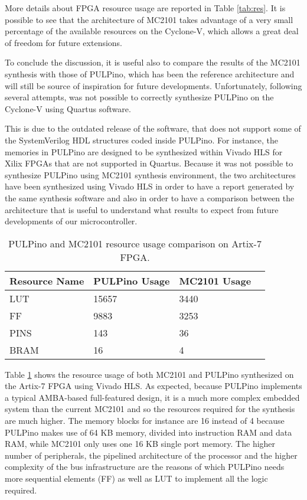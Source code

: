 More details about FPGA resource usage are reported in Table \ref{tab:res}. It is possible to see that the architecture of MC2101 takes advantage of a very small percentage of the available resources on the Cyclone-V, which allows a great deal of freedom for future extensions.

To conclude the discussion, it is useful also to compare the results of the MC2101 synthesis with those of PULPino, which has been the reference architecture and will still be source of inspiration for future developments. Unfortunately, following several attempts, was not possible to correctly synthesize PULPino on the Cyclone-V using Quartus software.

This is due to the outdated release of the software, that does not support some of the SystemVerilog HDL structures coded inside PULPino. For instance, the memories in PULPino are designed to be synthesized within Vivado HLS for Xilix FPGAs that are not supported in Quartus. Because it was not possible to synthesize PULPino using MC2101 synthesis environment, the two architectures have been synthesized using Vivado HLS in order to have a report generated by the same synthesis software and also in order to have a comparison between the architecture that is useful to understand what results to expect from future developments of our microcontroller.

\begin{table}
\centering
\begin{tabular}{| p{3cm} | p{2cm} | p{2cm} | p{2cm} |}
 \hline
 \textbf{Resource Name} & \textbf{PULPino Usage} & \textbf{MC2101 Usage}\\ \hline
 \hline\hline
  LUT & 15657  & 3440\\ 
 \hline
 FF & 9883  & 3253 \\
 \hline
 PINS & 143 & 36 \\
 \hline
 BRAM & 16 & 4 \\
 \hline
\end{tabular}
\caption{PULPino and MC2101 resource usage comparison on Artix-7 FPGA.}
\label{tab:res2} %
\end{table}

Table \ref{tab:res2} shows the resource usage of both MC2101 and PULPino synthesized on the Artix-7 FPGA using Vivado HLS. As expected, because PULPino implements a typical AMBA-based full-featured design, it is a much more complex embedded system than the current MC2101 and so the resources required for the synthesis are much higher. The memory blocks for instance are 16 instead of 4 because PULPino makes use of 64 KB memory, divided into instruction RAM and data RAM, while MC2101 only uses one 16 KB single port memory. The higher number of peripherals, the pipelined architecture of the processor and the higher complexity of the bus infrastructure are the reasons of which PULPino needs more sequential elements (FF) as well as LUT to implement all the logic required.